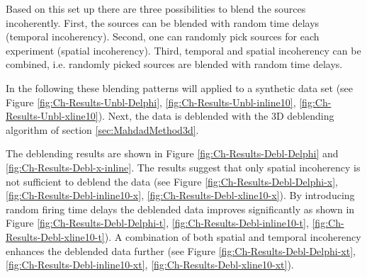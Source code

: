 Based on this set up there are three possibilities to blend the sources incoherently. First, the sources can be blended with random time delays (temporal incoherency). Second, one can randomly pick sources for each experiment (spatial incoherency). Third, temporal and spatial incoherency can be combined, i.e. randomly picked sources are blended with random time delays.

In the following these blending patterns will applied to a synthetic data set (see Figure \ref{fig:Ch-Results-Unbl-Delphi}, \ref{fig:Ch-Results-Unbl-inline10}, \ref{fig:Ch-Results-Unbl-xline10}). Next, the data is deblended with the 3D deblending algorithm of section \ref{sec:MahdadMethod3d}. 

The deblending results are shown in Figure \ref{fig:Ch-Results-Debl-Delphi} and \ref{fig:Ch-Results-Debl-x-inline}. The results suggest that only spatial incoherency is not sufficient to deblend the data (see Figure \ref{fig:Ch-Results-Debl-Delphi-x}, \ref{fig:Ch-Results-Debl-inline10-x}, \ref{fig:Ch-Results-Debl-xline10-x}). By introducing random firing time delays the deblended data improves significantly as shown in Figure \ref{fig:Ch-Results-Debl-Delphi-t}, \ref{fig:Ch-Results-Debl-inline10-t}, \ref{fig:Ch-Results-Debl-xline10-t}). A combination of both spatial and temporal incoherency enhances the deblended data further (see Figure \ref{fig:Ch-Results-Debl-Delphi-xt}, \ref{fig:Ch-Results-Debl-inline10-xt}, \ref{fig:Ch-Results-Debl-xline10-xt}).


